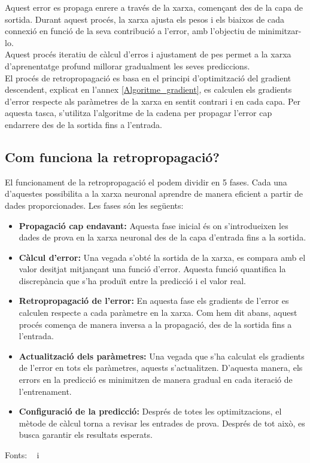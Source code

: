 Aquest error es propaga enrere a través de la xarxa, començant des de la capa de sortida. Durant aquest procés, la xarxa ajusta els pesos i els biaixos de cada connexió en funció de la seva contribució a l'error, amb l'objectiu de minimitzar-lo.\\

Aquest procés iteratiu de càlcul d'erros i ajustament de pes permet a la xarxa d'aprenentatge profund millorar gradualment les seves prediccions.\\

El procés de retropropagació es basa en el principi d'optimització del gradient descendent, explicat en l'annex \ref{Algoritme_gradient}, es calculen els gradients d'error respecte als paràmetres de la xarxa en sentit contrari i en cada capa. Per aquesta tasca, s'utilitza l'algoritme de la cadena per propagar l'error cap endarrere des de la sortida fins a l'entrada.

\subsection{Com funciona la retropropagació?}

El funcionament de la retropropagació el podem dividir en 5 fases. Cada una d'aquestes possibilita a la xarxa neuronal aprendre de manera eficient a partir de dades proporcionades. Les fases són les següents:

\begin{itemize}
    \item \textbf{Propagació cap endavant:} Aquesta fase inicial és on s'introdueixen les dades de prova en la xarxa neuronal des de la capa d'entrada fins a la sortida.

    \item \textbf{Càlcul d'error:} Una vegada s'obté la sortida de la xarxa, es compara amb el valor desitjat mitjançant una funció d'error. Aquesta funció quantifica la discrepància que s'ha produït entre la predicció i el valor real.

    \item \textbf{Retropropagació de l'error:} En aquesta fase els gradients de l'error es calculen respecte a cada paràmetre en la xarxa. Com hem dit abans, aquest procés comença de manera inversa a la propagació, des de la sortida fins a l'entrada.

    \item \textbf{Actualització dels paràmetres:} Una vegada que s'ha calculat els gradients de l'error en tots els paràmetres, aquests s'actualitzen. D'aquesta manera, els errors en la predicció es minimitzen de manera gradual en cada iteració de l'entrenament.

    \item \textbf{Configuració de la predicció:} Després de totes les optimitzacions, el mètode de càlcul torna a revisar les entrades de prova. Després de tot això, es busca garantir els resultats esperats.
\end{itemize}

Fonts: ~\cite{valencia} i~\cite{Retropropagacio}
